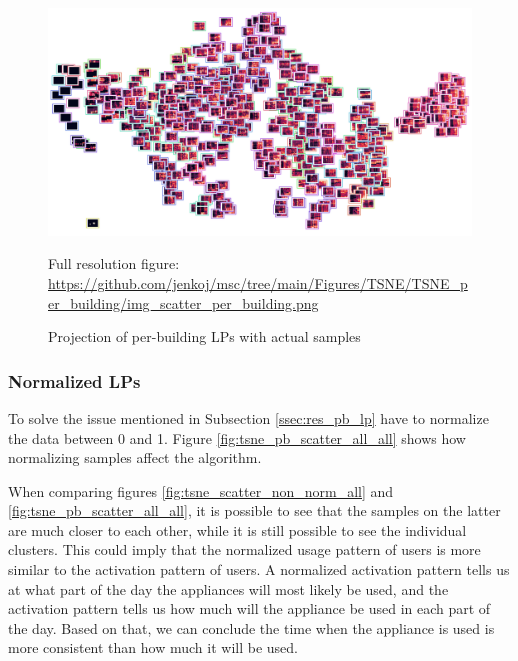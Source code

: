 \begin{figure}[H]
	\centering
	\caption{Projection of per-building LPs with actual samples}
	\includegraphics[width=.9\textwidth]{Figures/TSNE/TSNE_per_building/img_scatter_per_building.png}
	\label{fig:tsne_pb_img_scatter_allall}
	\par
	\par\footnotesize{Full resolution figure: \url{https://github.com/jenkoj/msc/tree/main/Figures/TSNE/TSNE_per_building/img_scatter_per_building.png}}
\end{figure}

\subsubsection{Normalized LPs}

To solve the issue mentioned in Subsection \ref{ssec:res_pb_lp} have to normalize the data between 0 and 1.
Figure \ref{fig:tsne_pb_scatter_all_all} shows how normalizing samples affect the algorithm.

When comparing figures \ref{fig:tsne_scatter_non_norm_all} and \ref{fig:tsne_pb_scatter_all_all},
it is possible to see that the samples on the latter are much closer to each other,
while it is still possible to see the individual clusters.
This could imply that the normalized usage pattern of users is more similar to the activation pattern of users.
A normalized activation pattern tells us at what part of the day the appliances will most likely be used,
and the activation pattern tells us how much will the appliance be used in each part of the day.
Based on that, we can conclude the time when the appliance is used is more consistent than how much it will be used. 


